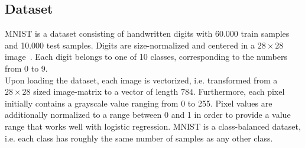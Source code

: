\documentclass{article}
\theoremstyle{plain}
\theoremstyle{definition}
\theoremstyle{remark}
\begin{document}
\subsection{Dataset}
MNIST is a dataset consisting of handwritten digits with 60.000 train samples and 10.000 test samples. Digits are size-normalized and centered in a $28 \times 28$ image~\cite{mnist}. Each digit belongs to one of 10 classes, corresponding to the  numbers from 0 to 9. \\
Upon loading the dataset, each image is vectorized, i.e. transformed from a $28 \times 28$ sized image-matrix to a vector of length $784$. Furthermore, each pixel initially contains a grayscale value ranging from 0 to 255. Pixel values are additionally normalized to a range between 0 and 1 in order to provide a value range that works well with logistic regression.
%
MNIST is a class-balanced dataset, i.e. each class has roughly the same number of samples as any other class.
\end{document}
